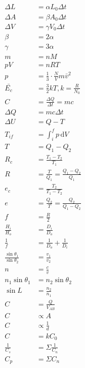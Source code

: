 \documentclass[12pt,a4paper]{article}
\begin{document}
		\begin{align}
			\Delta L &= \alpha L_0 \Delta t \\
			\Delta A &= \beta A_0 \Delta t \\
			\Delta V &= \gamma V_0 \Delta t \\
			\beta &= 2 \alpha \\
			\gamma &= 3 \alpha \\
			m &= n M \\
			p V &= n R T \\
			p &= \frac{1}{3} \cdot \frac{N}{V} m \bar{v}^2 \\
			\bar{E_c} &= \frac{3}{2} k T, k = \frac{R}{N_0} \\
			C &= \frac{\Delta Q}{\Delta t} = mc \\
			\Delta Q &= m c \Delta t \\
			\Delta U &= Q - T \\
			T_{if} &= \int_i^f p \, \mathrm{d} V \\
			T &= Q_1 - Q_2 \\
			R_c &= \frac{T_1 - T_2}{T_1} \\
			R &= \frac{T}{Q_1} = \frac{Q_1 - Q_2}{Q_1} \\
			e_c &= \frac{T_2}{T_1 - T_2} \\
			e &= \frac{Q_2}{T} = \frac{Q_2}{Q_1 - Q_2} \\
			f &= \frac{R}{2} \\
			\frac{H_i}{H_o} &= \frac{D_i}{D_o} \\
			\frac{1}{f} &= \frac{1}{D_o} + \frac{1}{D_i} \\
			\frac{\sin \theta_1}{\sin \theta_2} &= \frac{v_1}{v_2} \\
			n &= \frac{c}{v} \\
			n_1 \sin \theta_1 &= n_2 \sin \theta_2 \\
			\sin L &= \frac{n_2}{n_1} \\
			C &= \frac{Q}{V_{AB}} \\
			C &\propto A \\
			C &\propto \frac{1}{d} \\
			C &= k C_0 \\
			\frac{1}{C_s} &= \Sigma \frac{1}{C_n} \\
			C_p &= \Sigma C_n
		\end{align}
\end{document}
